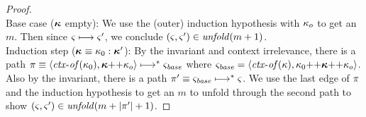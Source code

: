 \begin{proof}
\\
Base case ($\vec{\mkont}$ empty): We use the (outer) induction hypothesis with $\kappa_o$ to get an $m$. Then since $\varsigma \longmapsto \varsigma'$, we conclude $(\varsigma,\varsigma') \in \mathit{unfold}(m+1)$.
\\
Induction step ($\vec{\mkont} \equiv \mkont_0 : \vec{\mkont}'$):
By the invariant and context irrelevance, there is a path $\mtrace\equiv\tpl{\ctxof(\mkont_0), \append{\vec{\mkont}}{\mkont_o}} \stepto^* \mstate_\mathit{base}$ where $\mstate_\mathit{base} = \tpl{\ctxof(\mkont),\append{\mkont_0}{\append{\vec{\mkont}}{\mkont_o}}}$.
Also by the invariant, there is a path $\pi' \equiv \varsigma_\mathit{base} \longmapsto^* \varsigma$.
We use the last edge of $\pi$ and the induction hypothesis to get an $m$ to unfold through the second path to show $(\varsigma,\varsigma') \in \mathit{unfold}(m + |\pi'| + 1)$.



\end{proof}

